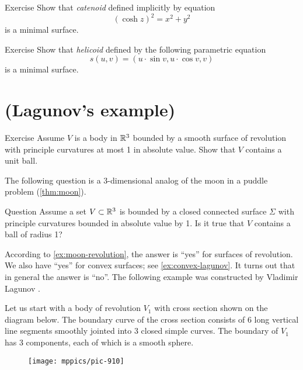 \begin{thm}{Exercise}\label{ex:catenoid-is-minimal}
Show that \emph{catenoid} defined implicitly by equation
\[(\cosh z)^2=x^2+y^2\]
is a minimal surface.
\end{thm}

\begin{thm}{Exercise}\label{ex:helicoid-is-minimal}
Show that \emph{helicoid} defined by the following parametric equation
\[s(u,v)=(u\cdot \sin v,u\cdot \cos v,v)\]
is a minimal surface.
\end{thm}

\section{(Lagunov's example)}

\begin{thm}{Exercise}\label{ex:moon-revolution}
Assume $V$ is a body in $\mathbb{R}^3$ bounded by a smooth surface of revolution with principle curvatures at most 1 in absolute value.
Show that $V$ contains a unit ball.
\end{thm}

The following question is a 3-dimensional analog of the moon in a puddle problem (\ref{thm:moon}).

\begin{thm}{Question}\label{quest:lagunov}
Assume a set $V\subset \mathbb{R}^3$ is bounded by a closed connected surface $\Sigma$ with 
principle curvatures bounded in absolute value by 1.
Is it true that $V$ contains a ball of radius 1?
\end{thm}

According to \ref{ex:moon-revolution}, the answer is ``yes'' for surfaces of revolution.
We also have ``yes'' for convex surfaces; see \ref{ex:convex-lagunov}.
It turns out that in general the answer is  ``no''.
The following example was constructed by Vladimir Lagunov \cite{lagunov}.


Let us start with a body of revolution $V_1$ with cross section shown on the diagram below.
The boundary curve of the cross section consists of 6 long vertical line segments smoothly jointed into 3 closed simple curves. 
The boundary of $V_1$ has 3 components, each of which is a smooth sphere.

\begin{wrapfigure}{o}{20 mm}
\vskip-0mm
\centering
\texttt{[image: mppics/pic-910]}
\vskip0mm
\end{wrapfigure}

